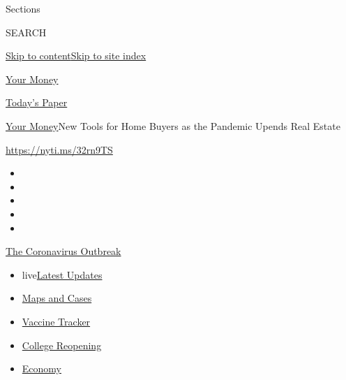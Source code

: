 Sections

SEARCH

\protect\hyperlink{site-content}{Skip to
content}\protect\hyperlink{site-index}{Skip to site index}

\href{https://www.nytimes3xbfgragh.onion/section/your-money}{Your Money}

\href{https://myaccount.nytimes3xbfgragh.onion/auth/login?response_type=cookie\&client_id=vi}{}

\href{https://www.nytimes3xbfgragh.onion/section/todayspaper}{Today's
Paper}

\href{/section/your-money}{Your Money}\textbar{}New Tools for Home
Buyers as the Pandemic Upends Real Estate

\href{https://nyti.ms/32rn9TS}{https://nyti.ms/32rn9TS}

\begin{itemize}
\item
\item
\item
\item
\item
\end{itemize}

\href{https://www.nytimes3xbfgragh.onion/news-event/coronavirus?action=click\&pgtype=Article\&state=default\&region=TOP_BANNER\&context=storylines_menu}{The
Coronavirus Outbreak}

\begin{itemize}
\tightlist
\item
  live\href{https://www.nytimes3xbfgragh.onion/2020/08/03/world/coronavirus-covid-19.html?action=click\&pgtype=Article\&state=default\&region=TOP_BANNER\&context=storylines_menu}{Latest
  Updates}
\item
  \href{https://www.nytimes3xbfgragh.onion/interactive/2020/us/coronavirus-us-cases.html?action=click\&pgtype=Article\&state=default\&region=TOP_BANNER\&context=storylines_menu}{Maps
  and Cases}
\item
  \href{https://www.nytimes3xbfgragh.onion/interactive/2020/science/coronavirus-vaccine-tracker.html?action=click\&pgtype=Article\&state=default\&region=TOP_BANNER\&context=storylines_menu}{Vaccine
  Tracker}
\item
  \href{https://www.nytimes3xbfgragh.onion/2020/08/02/us/covid-college-reopening.html?action=click\&pgtype=Article\&state=default\&region=TOP_BANNER\&context=storylines_menu}{College
  Reopening}
\item
  \href{https://www.nytimes3xbfgragh.onion/live/2020/08/03/business/stock-market-today-coronavirus?action=click\&pgtype=Article\&state=default\&region=TOP_BANNER\&context=storylines_menu}{Economy}
\end{itemize}

